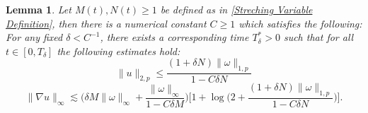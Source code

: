 \documentclass[12pt,letterpaper]{article}
\newtheorem{lem}[thm]{Lemma}
\theoremstyle{plain}
\begin{document}
\begin{lem}\label{Estimates of u}
Let $M(t),N(t)\ge 1$ be defined as in \eqref{Streching Variable Definition}, then
 there is a numerical constant $C\ge 1$ which satisfies the following: For any fixed  $\delta<C^{-1}$, there exists a corresponding time $T_\delta^*>0$ such that for all $t\in [0,T_\delta]$ the following estimates hold:
\begin{equation}\label{W2p estimate for u}
 \lVert u\rVert_{2,p}\le  \frac{ (1+\delta N)\lVert\omega\rVert_{1,p}}{1-C\delta N}
\end{equation}
\begin{equation}\label{Linfty estimate for nabla u}
 \lVert\nabla u\rVert_\infty\lesssim   \Big(\delta M\lVert\omega\rVert_\infty+\frac{ \lVert\omega\rVert_\infty}{1-C\delta M}\Big)\Big[1+\log 
 \Big(2+\frac{ (1+\delta N)\lVert\omega\rVert_{1,p}}{1-C\delta N}\Big)\Big].
\end{equation}
\end{lem}
\end{document}
